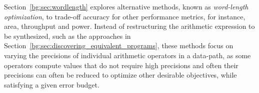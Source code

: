 Section~\ref{bg:sec:wordlength} explores alternative methods, known as
\emph{word-length optimization}, to trade-off accuracy for other performance
metrics, for instance, area, throughput and power.  Instead of restructuring
the arithmetic expression to be synthesized, such as the approaches in
Section~\ref{bg:sec:discovering_equivalent_programs}, these methods focus on
varying the precisions of individual arithmetic operators in a data-path, as
some operators compute values that do not require high precisions and often
their precisions can often be reduced to optimize other desirable objectives,
while satisfying a given error budget.
